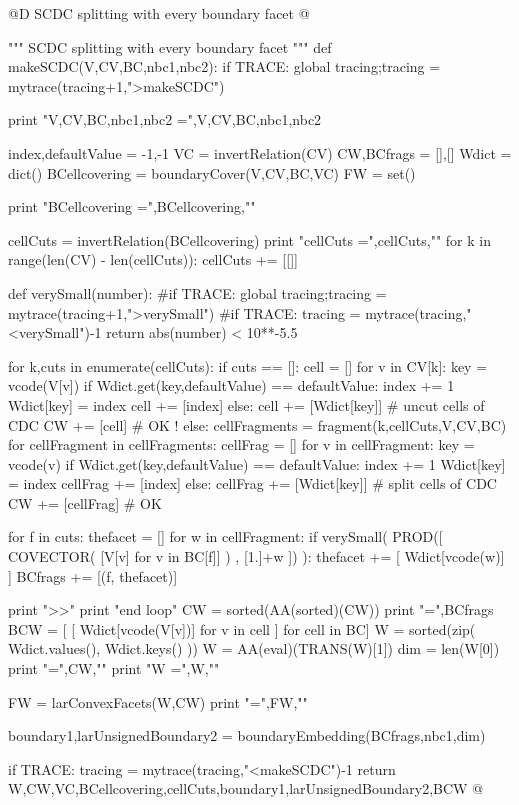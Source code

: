 \documentclass[11pt,oneside]{article}	%
\begin{document}
@D SCDC splitting with every boundary facet
@{""" SCDC splitting with every boundary facet """
def makeSCDC(V,CV,BC,nbc1,nbc2):
	if TRACE: global tracing;tracing = mytrace(tracing+1,">makeSCDC")

	print "V,CV,BC,nbc1,nbc2 =",V,CV,BC,nbc1,nbc2
		
	index,defaultValue = -1,-1
	VC = invertRelation(CV)
	CW,BCfrags = [],[]
	Wdict = dict()
	BCellcovering = boundaryCover(V,CV,BC,VC)
	FW = set()
	
	print "BCellcovering =",BCellcovering,"\n"

	cellCuts = invertRelation(BCellcovering)
	print "cellCuts =",cellCuts,"\n"
	for k in range(len(CV) - len(cellCuts)): cellCuts += [[]]

	def verySmall(number): 
		#if TRACE: global tracing;tracing = mytrace(tracing+1,">verySmall")		
		#if TRACE: tracing = mytrace(tracing,"<verySmall")-1
		return abs(number) < 10**-5.5
	
	for k,cuts in enumerate(cellCuts):
		if cuts == []:
			cell = []
			for v in CV[k]:
				key = vcode(V[v])
				if Wdict.get(key,defaultValue) == defaultValue:
					index += 1
					Wdict[key] = index
					cell += [index]
				else: 
					cell += [Wdict[key]]
			# uncut cells of CDC
			CW += [cell]  # OK !
		else:
			cellFragments = fragment(k,cellCuts,V,CV,BC)
			for cellFragment in cellFragments:
				cellFrag = []
				for v in cellFragment:
					key = vcode(v)
					if Wdict.get(key,defaultValue) == defaultValue:
						index += 1
						Wdict[key] = index
						cellFrag += [index]
					else: 
						cellFrag += [Wdict[key]]
				# split cells of CDC
				CW += [cellFrag]	  # OK

				for f in cuts:
					thefacet = []
					for w in cellFragment:
						if verySmall( PROD([ COVECTOR( [V[v] for v in BC[f]] ) , [1.]+w ]) ):
							thefacet += [ Wdict[vcode(w)] ]
					BCfrags += [(f, thefacet)]		
				
	print "\nmakeSCDC >>"
	print "end loop"
	CW = sorted(AA(sorted)(CW))
	print "\nBCfrags =",BCfrags
	BCW = [ [ Wdict[vcode(V[v])] for v in cell ] for cell in BC]
	W = sorted(zip( Wdict.values(), Wdict.keys() ))
	W = AA(eval)(TRANS(W)[1])
	dim = len(W[0])
	print "\nCW =",CW,"\n"
	print "W =",W,"\n"
	
	FW = larConvexFacets(W,CW)
	print "\nFW =",FW,"\n"
	
	boundary1,larUnsignedBoundary2 = boundaryEmbedding(BCfrags,nbc1,dim)

	if TRACE: tracing = mytrace(tracing,"<makeSCDC")-1
	return W,CW,VC,BCellcovering,cellCuts,boundary1,larUnsignedBoundary2,BCW
@}
\end{document}
